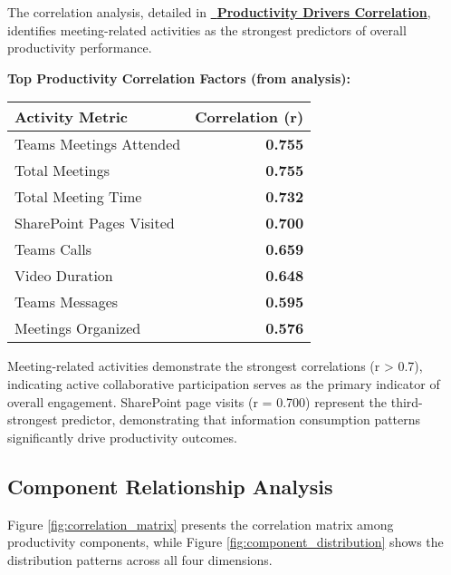 \documentclass[12pt,a4paper]{article}
\begin{document}
The correlation analysis, detailed in \textcolor{successGreen}{\href{https://fixysaskihumorizijuv.supabase.co/storage/v1/object/public/research-files/dd2c8aa8-1c3d-4592-8ce2-9e275d102803-productivity_drivers_correlation.csv?download=}{{\normalsize\faCogs}\, \textbf{Productivity Drivers Correlation}}}, identifies meeting-related activities as the strongest predictors of overall productivity performance.

\begin{highlightbox}
\textbf{\faChartLine \quad Top Productivity Correlation Factors (from analysis):}
\begin{center}
\begin{tabular}{@{}lr@{}}
\textbf{\color{primaryBlue}Activity Metric} & \textbf{\color{accentBlue}Correlation (r)} \\
\midrule
Teams Meetings Attended & \textbf{0.755} \\
Total Meetings & \textbf{0.755} \\
Total Meeting Time & \textbf{0.732} \\
SharePoint Pages Visited & \textbf{0.700} \\
Teams Calls & \textbf{0.659} \\
Video Duration & \textbf{0.648} \\
Teams Messages & \textbf{0.595} \\
Meetings Organized & \textbf{0.576} \\
\end{tabular}
\end{center}
\end{highlightbox}

Meeting-related activities demonstrate the strongest correlations (r > 0.7), indicating active collaborative participation serves as the primary indicator of overall engagement. SharePoint page visits (r = 0.700) represent the third-strongest predictor, demonstrating that information consumption patterns significantly drive productivity outcomes.

\subsection{Component Relationship Analysis}

Figure \ref{fig:correlation_matrix} presents the correlation matrix among productivity components, while Figure \ref{fig:component_distribution} shows the distribution patterns across all four dimensions.
\end{document}
